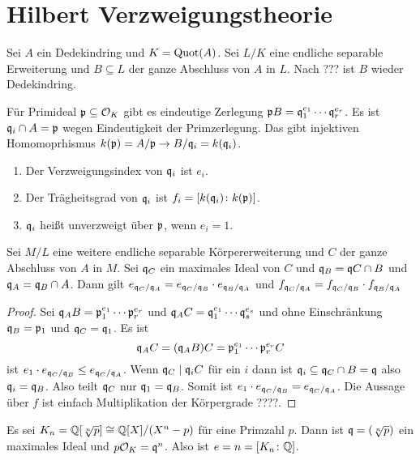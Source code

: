 \chapter{Hilbert Verzweigungstheorie}
Sei \(A\) ein Dedekindring und \(K=\operatorname{Quot}(A)\). Sei \(L/K\) eine endliche separable Erweiterung und \(B\subseteq L\) der ganze Abschluss von \(A\) in \(L\). Nach ??? ist \(B\) wieder Dedekindring.

\begin{Def}Für Primideal \(\mathfrak{p}\subseteq \mathcal{O}_K\) gibt es eindeutige Zerlegung 
	\(\mathfrak{p} B=\mathfrak{q}_1^{e_1}\cdots \mathfrak{q}_r^{e_r}\).
	Es ist \(\mathfrak{q}_i\cap A=\mathfrak{p}\) wegen Eindeutigkeit der Primzerlegung.
	Das gibt injektiven Homomoprhismus \(k(\mathfrak{p})=A/\mathfrak{p}\to B/\mathfrak{q}_i=k(\mathfrak{q}_i)\).
	\begin{enumerate}
		\item 
		Der Verzweigungsindex von \(\mathfrak{q}_i\) ist \(e_i\).
		\item Der Trägheitsgrad von \(\mathfrak{q}_i\) ist \(f_i=[k(\mathfrak{q}_i)\colon k(\mathfrak{p})]\).
		\item \(\mathfrak{q}_i\) heißt unverzweigt über \(\mathfrak{p}\), wenn \(e_i=1\).
	\end{enumerate}
	
\end{Def}
\begin{Lemma}
	Sei \(M/L\) eine weitere endliche separable Körpererweiterung und \(C\) der ganze Abschluss von \(A\) in \(M\). Sei \(\mathfrak{q}_C\) ein maximales Ideal von \(C\)
	und \(\mathfrak{q}_B=\mathfrak{q} C\cap B\) und \(\mathfrak{q}_A=\mathfrak{q}_B\cap A\).
	Dann gilt 
	\(e_{\mathfrak{q}_C/\mathfrak{q}_A}=e_{\mathfrak{q}_C/\mathfrak{q}_B}\cdot e_{\mathfrak{q}_B/\mathfrak{q}_A}\) und \(f_{\mathfrak{q}_C/\mathfrak{q}_A}=f_{\mathfrak{q}_C/\mathfrak{q}_B}\cdot f_{\mathfrak{q}_B/\mathfrak{q}_A}\)
\end{Lemma}
\begin{proof}
	Sei \(\mathfrak{q}_AB=\mathfrak{p}_1^{e_1}\cdots \mathfrak{p}_r^{e_r}\)
	und \(\mathfrak{q}_AC=\mathfrak{q}_1^{e_1}\cdots \mathfrak{q}_s^{e_s}\)
	und ohne Einschränkung \(\mathfrak{q}_B=\mathfrak{p}_1\) und \(\mathfrak{q}_C=\mathfrak{q}_1\).
	Es ist
	\[\mathfrak{q}_AC=(\mathfrak{q}_AB)C=\mathfrak{p}_1^{e_1}\cdots \mathfrak{p}_r^{e_r}C\] ist \(e_1\cdot e_{\mathfrak{q}_C/\mathfrak{q}_B}\leq e_{\mathfrak{q}_C/\mathfrak{q}_A}\).
	Wenn \(\mathfrak{q}_C\mid \mathfrak{q}_iC\) für ein \(i\) dann ist
	\(\mathfrak{q}_i\subseteq \mathfrak{q}_C\cap B=\mathfrak{q}\) also \(\mathfrak{q}_i=\mathfrak{q}_B\).
	Also teilt \(\mathfrak{q}_C\) nur \(\mathfrak{q}_1=\mathfrak{q}_B\).
	Somit ist \(e_1\cdot e_{\mathfrak{q}_C/\mathfrak{q}_B}= e_{\mathfrak{q}_C/\mathfrak{q}_A}\).
	Die Aussage über \(f\) ist einfach Multiplikation der Körpergrade ????.
\end{proof}
\begin{Bsp}
	Es sei \(K_n=\mathbb{Q}[\sqrt[n]{p}]\cong \mathbb{Q}[X]/(X^n-p)\) für eine Primzahl \(p\). Dann ist \(\mathfrak{q}=(\sqrt[n]{p})\) ein maximales Ideal und 
	\(p\mathcal{O}_K=\mathfrak{q}^n\). Also ist \(e=n=[K_n\colon \mathbb{Q}]\).
	
\end{Bsp}
